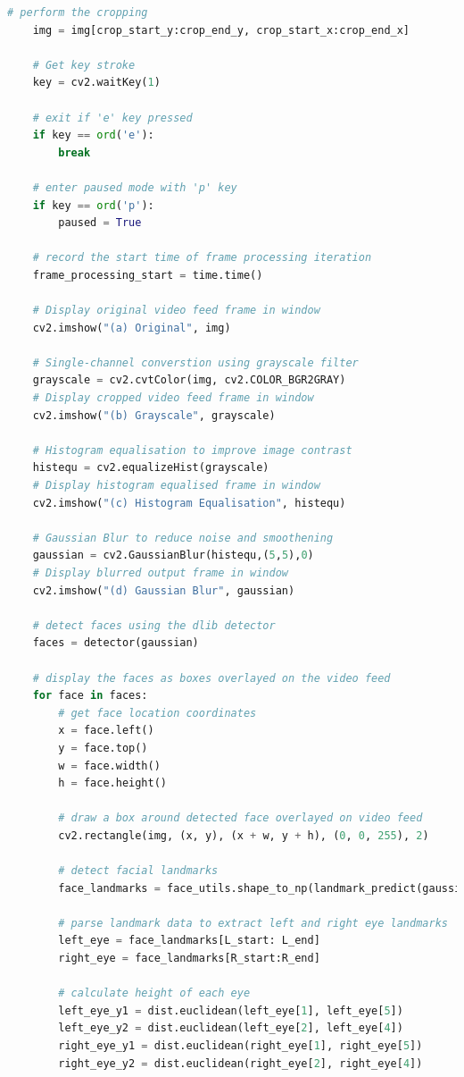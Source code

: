 \documentclass[10pt,conference]{IEEEtran}
\begin{document}
\begin{lstlisting}[language=Python,basicstyle=\tiny, showspaces=false, showstringspaces=false tabsize=1, breaklines=true]
    # perform the cropping
    img = img[crop_start_y:crop_end_y, crop_start_x:crop_end_x]

    # Get key stroke
    key = cv2.waitKey(1)

    # exit if 'e' key pressed
    if key == ord('e'):
        break

    # enter paused mode with 'p' key
    if key == ord('p'):
        paused = True

    # record the start time of frame processing iteration
    frame_processing_start = time.time()

    # Display original video feed frame in window
    cv2.imshow("(a) Original", img)
    
    # Single-channel converstion using grayscale filter
    grayscale = cv2.cvtColor(img, cv2.COLOR_BGR2GRAY)
    # Display cropped video feed frame in window
    cv2.imshow("(b) Grayscale", grayscale)

    # Histogram equalisation to improve image contrast
    histequ = cv2.equalizeHist(grayscale)
    # Display histogram equalised frame in window
    cv2.imshow("(c) Histogram Equalisation", histequ)

    # Gaussian Blur to reduce noise and smoothening
    gaussian = cv2.GaussianBlur(histequ,(5,5),0)
    # Display blurred output frame in window
    cv2.imshow("(d) Gaussian Blur", gaussian)

    # detect faces using the dlib detector
    faces = detector(gaussian)

    # display the faces as boxes overlayed on the video feed
    for face in faces:
        # get face location coordinates
        x = face.left()
        y = face.top()
        w = face.width()
        h = face.height()
        
        # draw a box around detected face overlayed on video feed
        cv2.rectangle(img, (x, y), (x + w, y + h), (0, 0, 255), 2)

        # detect facial landmarks
        face_landmarks = face_utils.shape_to_np(landmark_predict(gaussian, face))

        # parse landmark data to extract left and right eye landmarks
        left_eye = face_landmarks[L_start: L_end]
        right_eye = face_landmarks[R_start:R_end]

        # calculate height of each eye
        left_eye_y1 = dist.euclidean(left_eye[1], left_eye[5])
        left_eye_y2 = dist.euclidean(left_eye[2], left_eye[4])
        right_eye_y1 = dist.euclidean(right_eye[1], right_eye[5])
        right_eye_y2 = dist.euclidean(right_eye[2], right_eye[4])


\end{lstlisting}
\end{document}
